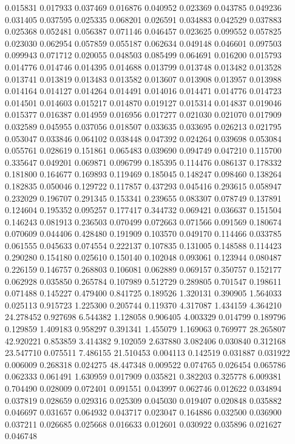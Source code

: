 0.015831
0.017933
0.037469
0.016876
0.040952
0.023369
0.043785
0.049236
0.031405
0.037595
0.025335
0.068201
0.026591
0.034883
0.042529
0.037883
0.025368
0.052481
0.056387
0.071146
0.046457
0.023625
0.099552
0.057825
0.023030
0.062954
0.057859
0.055187
0.062634
0.049148
0.046601
0.097503
0.099943
0.071712
0.020055
0.048503
0.085499
0.064691
0.016200
0.015793
0.014776
0.014746
0.014395
0.014688
0.013799
0.013748
0.013482
0.013528
0.013741
0.013819
0.013483
0.013582
0.013607
0.013908
0.013957
0.013988
0.014164
0.014127
0.014264
0.014491
0.014016
0.014471
0.014776
0.014723
0.014501
0.014603
0.015217
0.014870
0.019127
0.015314
0.014837
0.019046
0.015377
0.016387
0.014959
0.016956
0.017277
0.021030
0.021070
0.017909
0.032589
0.045955
0.037056
0.018507
0.033635
0.033695
0.026213
0.021795
0.053047
0.033846
0.064102
0.038448
0.047392
0.024264
0.039698
0.053084
0.055761
0.028619
0.151861
0.065483
0.039690
0.094749
0.047210
0.115700
0.335647
0.049201
0.069871
0.096799
0.185395
0.114476
0.086137
0.178332
0.181800
0.164677
0.169893
0.119469
0.185045
0.148247
0.098460
0.138264
0.182835
0.050046
0.129722
0.117857
0.437293
0.045416
0.293615
0.058947
0.232029
0.196707
0.291345
0.153341
0.239655
0.083307
0.078749
0.137891
0.124604
0.195352
0.095257
0.177417
0.344732
0.069421
0.036637
0.151504
0.146243
0.081913
0.236503
0.070499
0.072663
0.071566
0.091569
0.180674
0.070609
0.044406
0.428480
0.191909
0.103570
0.049170
0.114466
0.033785
0.061555
0.045633
0.074554
0.222137
0.107835
0.131005
0.148588
0.114423
0.290280
0.154180
0.025610
0.150140
0.102048
0.093061
0.123944
0.080487
0.226159
0.146757
0.268803
0.106081
0.062889
0.069157
0.350757
0.152177
0.062928
0.035850
0.265784
0.107989
0.512729
0.289805
0.701547
0.198611
0.071488
0.145227
0.479400
0.841725
0.189526
1.320131
0.390905
1.564033
0.025113
0.915723
1.225300
0.205744
0.119370
4.317087
1.434159
4.364210
24.278452
0.927698
6.544382
1.128058
0.906405
4.003329
0.014799
0.189796
0.129859
1.409183
0.958297
0.391341
1.455079
1.169063
0.769977
28.265807
42.920221
0.853859
3.414382
9.102059
2.637880
3.082406
0.030840
0.312168
23.547710
0.075511
7.486155
21.510453
0.004113
0.142519
0.031887
0.031922
0.006009
0.268318
0.024275
48.447348
0.009522
0.074765
0.026454
0.065786
0.062333
0.061491
1.630959
0.017909
0.035821
0.382203
0.325778
6.009381
0.704490
0.028009
0.072401
0.091551
0.043997
0.062746
0.012622
0.034894
0.037819
0.028659
0.029316
0.025309
0.045030
0.019407
0.020848
0.035882
0.046697
0.031657
0.064932
0.043717
0.023047
0.164886
0.032500
0.036900
0.037211
0.026685
0.025668
0.016633
0.012601
0.030922
0.035896
0.021627
0.046748
